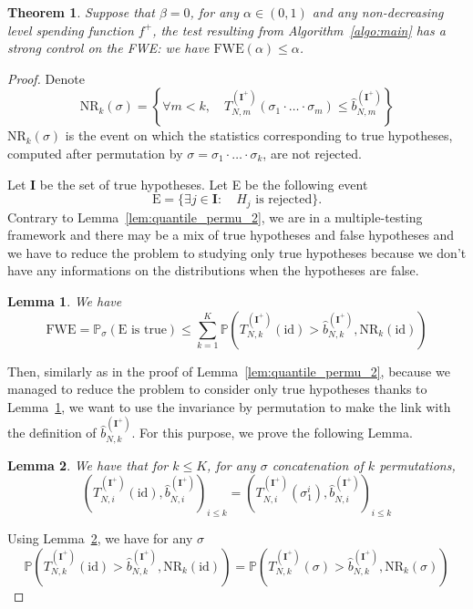 \documentclass{article}
\theoremstyle{plain}
\newtheorem{Theorem}{Theorem}
\newtheorem{Lemma}{Lemma}
\theoremstyle{remark}
\renewcommand{\P}{\mathbb{P}}
\newcommand{\1}{\mathbbm{1}}
\newcommand{\id}{\mathrm{id}}
\numberwithin{equation}{section}
\begin{document}
\begin{Theorem}\label{th:multi_FWE}
Suppose that $\beta = 0$, for any $\alpha \in (0,1)$ and any non-decreasing level spending function $f^+$, the test resulting from Algorithm~\ref{algo:main} has a strong control on the FWE: we have $\mathrm{FWE}(\alpha)\le\alpha$.
\end{Theorem}
\begin{proof}
Denote 
$$\mathrm{NR}_k(\sigma) = \left\{\forall m < k,\quad  T_{N,m}^{(\textbf{I}^+)}(\sigma_1\cdot\ldots\cdot\sigma_m) \le   \widehat{b}_{N,m}^{(\textbf{I}^+)}\right\}$$
$\mathrm{NR}_k(\sigma)$ is the event on which the statistics corresponding to true hypotheses, computed after permutation by $\sigma=\sigma_1\cdot \ldots \cdot \sigma_k$, are not rejected.


Let $\textbf{I}$ be the set of true hypotheses. Let E be the following event
$$\mathrm{E}= \{ \exists j \in \textbf{I}: \quad H_j \text{ is rejected}\}.$$
Contrary to Lemma~\ref{lem:quantile_permu_2}, we are in a multiple-testing framework and there may be a mix of true hypotheses and false hypotheses and we have to reduce the problem to studying only true hypotheses because we don't have any informations on the distributions when the hypotheses are false.
\begin{Lemma}\label{lem:multiple_test_FWE}
We have 
$$\mathrm{FWE} = \P_\sigma\left(\text{E is true} \right) \le \sum_{k=1}^K\P\left( T_{N,k}^{(\textbf{I}^+)}(\id) > \widehat{b}_{N,k}^{(\textbf{I}^+)}, \mathrm{NR}_k(\id)\right)  $$
\end{Lemma}
Then, similarly as in the proof of Lemma~\ref{lem:quantile_permu_2}, because we managed to reduce the problem to consider only true hypotheses thanks to Lemma~\ref{lem:multiple_test_FWE}, we want to use the invariance by permutation to make the link with the definition of $\widehat{b}_{N,k}^{(\textbf{I}^+)}$. For this purpose, we prove the following Lemma.


\begin{Lemma}\label{lem:invariance}
We have that for $k \le K$, for any $\sigma$ concatenation of $k$ permutations, 
$$(T_{N,i}^{(\textbf{I}^+)}(\id),\widehat{b}_{N,i}^{(\textbf{I}^+)})_{i\le k}=(T_{N,i}^{(\textbf{I}^+)}(\sigma_1^i), \widehat{b}_{N,i}^{(\textbf{I}^+)})_{i\le k}$$
\end{Lemma}
Using Lemma~\ref{lem:invariance}, we have for any $\sigma$
$$\P\left(T_{N,k}^{(\textbf{I}^+)}(\id) > \widehat{b}_{N,k}^{(\textbf{I}^+)}, \mathrm{NR}_k(\id ) \right) = \P\left(T_{N,k}^{(\textbf{I}^+)}(\sigma) > \widehat{b}_{N,k}^{(\textbf{I}^+)}, \mathrm{NR}_k(\sigma) \right)$$


\end{proof}
\end{document}

